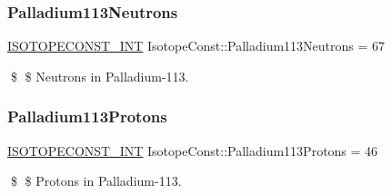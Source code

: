 \subsubsection{\texorpdfstring{Palladium113\+Neutrons}{Palladium113Neutrons}}
{\footnotesize\ttfamily \mbox{\hyperlink{group___isotope_const-_macros_ga5f18360b3e99483a35c32d789e62621c}{I\+S\+O\+T\+O\+P\+E\+C\+O\+N\+S\+T\+\_\+\+I\+NT}} Isotope\+Const\+::\+Palladium113\+Neutrons = 67}

\$ \$ Neutrons in Palladium-\/113. \mbox{\label{group___isotope_const-_palladium-_pd113_ga70de02888e3e39a6d9fd7ffc0ca9d21b}} 
\subsubsection{\texorpdfstring{Palladium113\+Protons}{Palladium113Protons}}
{\footnotesize\ttfamily \mbox{\hyperlink{group___isotope_const-_macros_ga5f18360b3e99483a35c32d789e62621c}{I\+S\+O\+T\+O\+P\+E\+C\+O\+N\+S\+T\+\_\+\+I\+NT}} Isotope\+Const\+::\+Palladium113\+Protons = 46}

\$ \$ Protons in Palladium-\/113. 